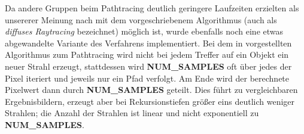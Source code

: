 Da andere Gruppen beim Pathtracing deutlich geringere Laufzeiten erzielten als unsererer Meinung nach mit dem vorgeschriebenem Algorithmus (auch als \textit{diffuses Raytracing} bezeichnet) möglich ist, wurde ebenfalls noch eine etwas abgewandelte Variante des Verfahrens implementiert. Bei dem in \autocite{Kajiya:1986:RE:15886.15902} vorgestellten Algorithmus zum Pathtracing wird nicht bei jedem Treffer auf ein Objekt ein neuer Strahl erzeugt, stattdessen wird \textbf{NUM\_SAMPLES} oft über jedes der Pixel iteriert und jeweils nur ein Pfad verfolgt. Am Ende wird der berechnete Pixelwert dann durch \textbf{NUM\_SAMPLES} geteilt. Dies führt zu vergleichbaren Ergebnisbildern, erzeugt aber bei Rekursionstiefen größer eins deutlich weniger Strahlen; die Anzahl der Strahlen ist linear und nicht exponentiell zu \textbf{NUM\_SAMPLES}.




